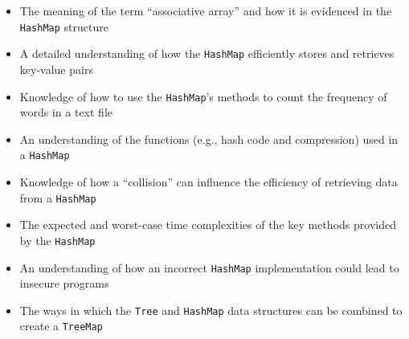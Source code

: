 \documentclass[11pt]{article}
\newcommand{\program}[1]{\lstinline{#1}}
\begin{document}
\begin{itemize}

  \item The meaning of the term ``associative array'' and how it is evidenced in
    the \program{HashMap} structure

  \item A detailed understanding of how the \program{HashMap} efficiently stores and
    retrieves key-value pairs

  \item Knowledge of how to use the \program{HashMap}'s methods to count the
    frequency of words in a text file

  \item An understanding of the functions (e.g., hash code and compression) used
    in a \program{HashMap}

  \item Knowledge of how a ``collision'' can influence the efficiency of
    retrieving data from a \program{HashMap}

  \item The expected and worst-case time complexities of the key methods
    provided by the \program{HashMap}

  \item An understanding of how an incorrect \program{HashMap} implementation
    could lead to insecure programs

  \item The ways in which the \program{Tree} and \program{HashMap} data
    structures can be combined to create a \program{TreeMap}

\end{itemize}
\end{document}
